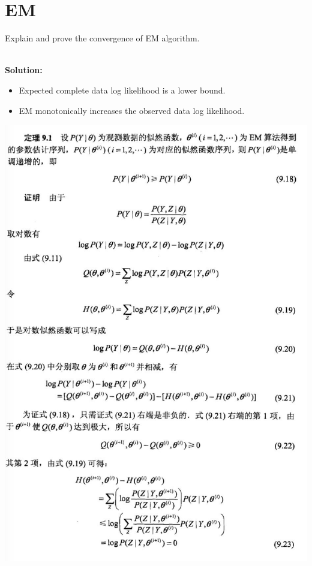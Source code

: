 
\section{EM}

Explain and prove the convergence of EM algorithm.

\ \\{\bf Solution:} 
\begin{itemize}
\item Expected complete data log likelihood is a lower bound. 
\item EM monotonically increases the observed data log likelihood.
\end{itemize}

\includegraphics[width=\columnwidth]{19}